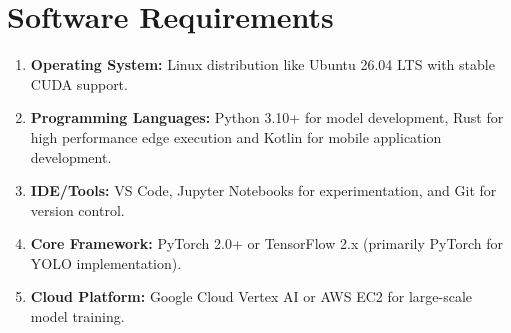 \section{Software Requirements}
\begin{enumerate}[label=\roman*.]
    \item \textbf{Operating System:} Linux distribution like Ubuntu 26.04 LTS with stable CUDA support.
    \item \textbf{Programming Languages:} Python 3.10+ for model development, Rust for high performance edge execution and Kotlin for mobile application development.
    \item \textbf{IDE/Tools:} VS Code, Jupyter Notebooks for experimentation, and Git for version control.
    \item \textbf{Core Framework:} PyTorch 2.0+ or TensorFlow 2.x (primarily PyTorch for YOLO implementation).
    \item \textbf{Cloud Platform:} Google Cloud Vertex AI or AWS EC2 for large-scale model training.
\end{enumerate}
